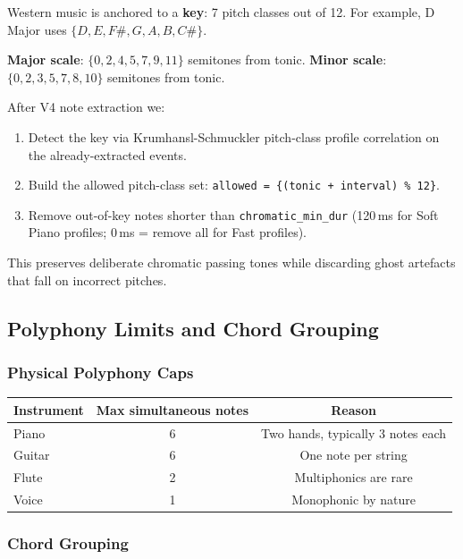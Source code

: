 \documentclass[12pt, a4paper]{article}
\begin{document}
Western music is anchored to a \textbf{key}: 7 pitch classes out of 12.
For example, D Major uses $\{D, E, F\#, G, A, B, C\#\}$.

\begin{mathbox}
  \textbf{Major scale}: $\{0, 2, 4, 5, 7, 9, 11\}$ semitones from tonic.\newline
  \textbf{Minor scale}: $\{0, 2, 3, 5, 7, 8, 10\}$ semitones from tonic.
\end{mathbox}

After V4 note extraction we:
\begin{enumerate}[leftmargin=2em]
  \item Detect the key via Krumhansl-Schmuckler pitch-class profile
        correlation on the already-extracted events.
  \item Build the allowed pitch-class set:
        \texttt{allowed = \{(tonic + interval) \% 12\}}.
  \item Remove out-of-key notes shorter than \texttt{chromatic\_min\_dur}
        (120\,ms for Soft Piano profiles; 0\,ms = remove all for Fast profiles).
\end{enumerate}
This preserves deliberate chromatic passing tones while discarding ghost
artefacts that fall on incorrect pitches.

\subsection{Polyphony Limits and Chord Grouping}

\subsubsection{Physical Polyphony Caps}

\begin{center}
\begin{tabular}{lcc}
  \toprule
  Instrument & Max simultaneous notes & Reason \\
  \midrule
  Piano  & 6 & Two hands, typically 3 notes each \\
  Guitar & 6 & One note per string \\
  Flute  & 2 & Multiphonics are rare \\
  Voice  & 1 & Monophonic by nature \\
  \bottomrule
\end{tabular}
\end{center}

\subsubsection{Chord Grouping}
\end{document}
